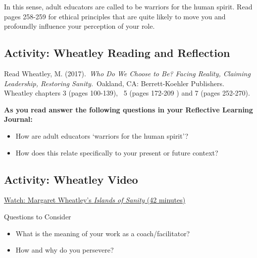 \documentclass[
]{book}
\providecommand{\tightlist}{%
  \setlength{\itemsep}{0pt}\setlength{\parskip}{0pt}}
\begin{document}
In this sense, adult educators are called to be warriors for the human spirit. Read pages 258-259 for ethical principles that are quite likely to move you and profoundly influence your perception of your role.

\hypertarget{activity-wheatley-reading-and-reflection-1}{%
\subsection*{Activity: Wheatley Reading and Reflection}\label{activity-wheatley-reading-and-reflection-1}}

\begin{reflect}
Read Wheatley, M. (2017).~\emph{Who Do We Choose to Be? Facing Reality,
Claiming Leadership, Restoring Sanity.}~Oakland, CA: Berrett-Koehler
Publishers. Wheatley chapters 3 (pages 100-139), ~5 (pages 172-209 ) and
7 (pages 252-270).

\textbf{As you read answer the following questions in your Reflective
Learning Journal:}

\begin{itemize}
\tightlist
\item
  How are adult educators `warriors for the human spirit'?\\
\item
  How does this relate specifically to your present or future context?
\end{itemize}
\end{reflect}

\hypertarget{activity-wheatley-video}{%
\subsection*{Activity: Wheatley Video}\label{activity-wheatley-video}}

\begin{reflect}
\href{https://www.youtube.com/watch?v=LtaYNxp56gs}{Watch: Margaret
Wheatley's \emph{Islands of Sanity} (42 minutes)}

{Questions to Consider}

\begin{itemize}
\tightlist
\item
  What is the meaning of your work as a coach/facilitator?\\
\item
  How and why do you persevere?
\end{itemize}
\end{reflect}
\end{document}
